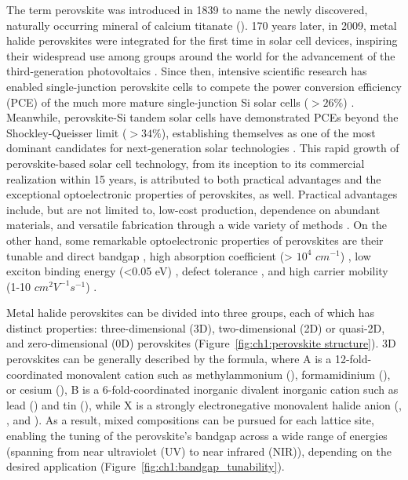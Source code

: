The term perovskite was introduced in 1839 to name the newly discovered, naturally occurring mineral of calcium titanate (). 170 years later, in 2009, metal halide perovskites were integrated for the first time in solar cell devices, inspiring their widespread use among groups around the world for the advancement of the third-generation photovoltaics \cite{Kojima2009OrganometalCells}. Since then, intensive scientific research has enabled single-junction perovskite cells to compete the power conversion efficiency (PCE) of the much more mature single-junction Si solar cells ($> 26\%$) \cite{Green2024Solar64}. Meanwhile, perovskite-Si tandem solar cells have demonstrated PCEs beyond the Shockley-Queisser limit ($>34\%$), establishing themselves as one of the most dominant candidates for next-generation solar technologies \cite{Hasan2024StabilityReview, Noman2024ATechnology}. This rapid growth of perovskite-based solar cell technology, from its inception to its commercial realization within 15 years, is attributed to both practical advantages and the exceptional optoelectronic properties of perovskites, as well. Practical advantages include, but are not limited to, low-cost production, dependence on abundant materials, and versatile fabrication through a wide variety of methods \cite{Fan2014Perovskite-basedCells}. On the other hand, some remarkable optoelectronic properties of perovskites are their tunable and direct bandgap \cite{Gholipour2020BandgapMaterials}, high absorption coefficient (> $10^4$ $cm^{-1}$) \cite{Park2015PerovskiteTechnology}, low exciton binding energy (<0.05 eV) \cite{Lin2015Electro-opticsCells}, defect tolerance \cite{Kumar2021RoleApplications}, and high carrier mobility (1-10 $cm^2V^{-1}s^{-1}$) \cite{Motta2015ChargePerovskites}. 


Metal halide perovskites can be divided into three groups, each of which has distinct properties: three-dimensional (3D), two-dimensional (2D) or quasi-2D, and zero-dimensional (0D) perovskites (Figure~\ref{fig:ch1:perovskite structure}). 3D perovskites can be generally described by the  formula, where A is a 12-fold-coordinated monovalent cation such as methylammonium (), formamidinium (), or cesium (), B is a 6-fold-coordinated inorganic divalent inorganic cation such as lead () and tin (), while X is a strongly electronegative monovalent halide anion (, , and ). As a result, mixed compositions can be pursued for each lattice site, enabling the tuning of the perovskite's bandgap across a wide range of energies (spanning from near ultraviolet (UV) to near infrared (NIR)), depending on the desired application (Figure~\ref{fig:ch1:bandgap_tunability}).

